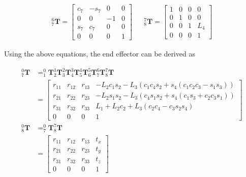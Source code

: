 \begin{align}
    \nonumber \\
    _{7}^{6}\mathbf{T} = \left[\begin{matrix}c_{7} & - s_{7} & 0 & 0\\0 & 0 & -1 & 0\\s_{7} & c_{7} & 0 & 0\\0 & 0 & 0 & 1\end{matrix}\right]
    &&
    _{8}^{7}\mathbf{T} = \left[\begin{matrix}1 & 0 & 0 & 0\\0 & 1 & 0 & 0\\0 & 0 & 1 & L_{4}\\0 & 0 & 0 & 1\end{matrix}\right]
    \nonumber
\end{align}

Using the above equations, the end effector can be derived as

\begin{equation}
    \begin{split}
        _{7}^{0}\mathbf{T} &= ^{0}_{1}\mathbf{T} ^{1}_{2}\mathbf{T} ^{2}_{3}\mathbf{T} ^{3}_{4}\mathbf{T} ^{4}_{5}\mathbf{T} ^{5}_{6}\mathbf{T} ^{6}_{7}\mathbf{T} ^{7}_{8}\mathbf{T} \\
        &= \begin{bmatrix}
            r_{11} & r_{12} & r_{13} & - L_{2} c_{1} s_{2} - L_{3} \left(c_{1} c_{4} s_{2} + s_{4} \left(c_{1} c_{2} c_{3} - s_{1} s_{3}\right)\right) \\
            r_{21} & r_{22} & r_{23} & - L_{2} s_{1} s_{2} - L_{3} \left(c_{4} s_{1} s_{2} + s_{4} \left(c_{1} s_{3} + c_{2} c_{3} s_{1}\right)\right) \\
            r_{31} & r_{32} & r_{33} & L_{1} + L_{2} c_{2} + L_{3} \left(c_{2} c_{4} - c_{3} s_{2} s_{4}\right) \\
            0 & 0 & 0 & 1
            \end{bmatrix} \\
        _{8}^{0}\mathbf{T} &= ^{0}_{7}\mathbf{T} ^{7}_{8}\mathbf{T} \\
        &= \begin{bmatrix}
            r_{11} & r_{12} & r_{13} &  t_x \\
            r_{21} & r_{22} & r_{23} &  t_y \\
            r_{31} & r_{32} & r_{33} &  t_z \\
            0 & 0 & 0 & 1
            \end{bmatrix}
    \end{split}
    \label{eq:dh-tooltip-matrices}
\end{equation}

